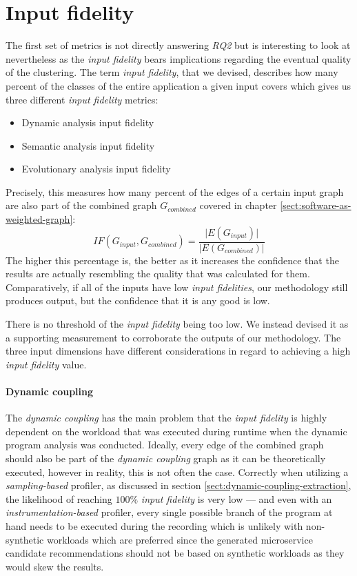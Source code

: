 \documentclass[12pt,a4paper]{report}
\begin{document}
\section{Input fidelity} \label{sect:input-fidelity-metrics}

The first set of metrics is not directly answering \textit{RQ2} but is
interesting to look at nevertheless as the \textit{input fidelity} bears
implications regarding the eventual quality of the clustering. The term \textit{
input fidelity}, that we devised, describes how many percent of the classes of
the entire application a given input covers which gives us three different
\textit{input fidelity} metrics:
\begin{itemize}[noitemsep]
  \item Dynamic analysis input fidelity
  \item Semantic analysis input fidelity
  \item Evolutionary analysis input fidelity
\end{itemize}

Precisely, this measures how many percent of the edges of a certain input graph
are also part of the combined graph \(G_{combined}\) covered in chapter
\ref{sect:software-as-weighted-graph}:
\[
  IF(G_{input}, G_{combined}) = \frac{\vert E(G_{input}) \vert}{\vert E(G_{combined}) \vert}
\]
The higher this percentage
is, the better as it increases the confidence that the results are actually
resembling the quality that was calculated for them. Comparatively, if all of
the inputs have low \textit{input fidelities}, our methodology still produces
output, but the confidence that it is any good is low.

There is no threshold of the \textit{input fidelity} being too low. We instead
devised it as a supporting measurement to corroborate the outputs of our
methodology. The three input dimensions have different considerations in
regard to achieving a high \textit{input fidelity} value.

\paragraph{Dynamic coupling}
The \textit{dynamic coupling} has the main problem
that the \textit{input fidelity} is highly dependent on the workload that was
executed during runtime when the dynamic program analysis was conducted.
Ideally, every edge of the combined graph should also be part of the \textit{
dynamic coupling} graph as it can be theoretically executed, however in
reality, this is not often the case. Correctly when utilizing a \textit{
sampling\hyp based} profiler, as discussed in section
\ref{sect:dynamic-coupling-extraction}, the likelihood of reaching \(100\%\)
\textit{input fidelity} is very low --- and even with an \textit{instrumentation\hyp based}
profiler, every single possible branch of the program at hand needs to be
executed during the recording which is unlikely with non\hyp synthetic
workloads which are preferred since the generated microservice candidate
recommendations should not be based on synthetic workloads as they would skew
the results.
\end{document}

